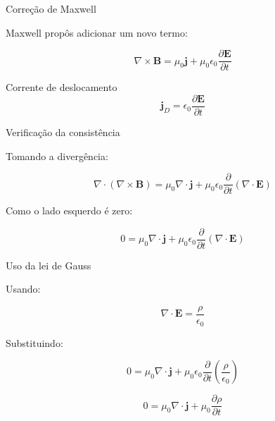 \documentclass[aspectratio=169]{beamer}
\begin{document}
\begin{frame}{Correção de Maxwell}
\small

Maxwell propôs adicionar um novo termo:

\begin{equation}
\nabla\times \mathbf{B}
=
\mu_0 \mathbf{j}
+
\mu_0 \epsilon_0 \frac{\partial \mathbf{E}}{\partial t}
\tag{2.32}
\label{eq:ampere_maxwell}
\end{equation}

\begin{block}{Corrente de deslocamento}
\[
\mathbf{j}_D=\epsilon_0 \frac{\partial \mathbf{E}}{\partial t}
\]
\end{block}

\end{frame}


\begin{frame}{Verificação da consistência}
\small

Tomando a divergência:

\begin{equation}
\nabla\cdot(\nabla\times \mathbf{B})
=
\mu_0 \nabla\cdot \mathbf{j}
+
\mu_0 \epsilon_0 \frac{\partial}{\partial t}(\nabla\cdot \mathbf{E})
\label{eq:div_ampere_maxwell}
\end{equation}

Como o lado esquerdo é zero:

\begin{equation}
0=
\mu_0 \nabla\cdot \mathbf{j}
+
\mu_0 \epsilon_0 \frac{\partial}{\partial t}(\nabla\cdot \mathbf{E})
\label{eq:zero}
\end{equation}

\end{frame}


\begin{frame}{Uso da lei de Gauss}
\small

Usando:

\begin{equation}
\nabla\cdot \mathbf{E}=\frac{\rho}{\epsilon_0}
\label{eq:gauss2}
\end{equation}

Substituindo:

\begin{equation}
0=
\mu_0 \nabla\cdot \mathbf{j}
+
\mu_0 \epsilon_0 \frac{\partial}{\partial t}
\left(\frac{\rho}{\epsilon_0}\right)
\label{eq:substitute}
\end{equation}

\begin{equation}
0=
\mu_0 \nabla\cdot \mathbf{j}
+
\mu_0 \frac{\partial \rho}{\partial t}
\label{eq:simplify}
\end{equation}

\end{frame}
\end{document}
